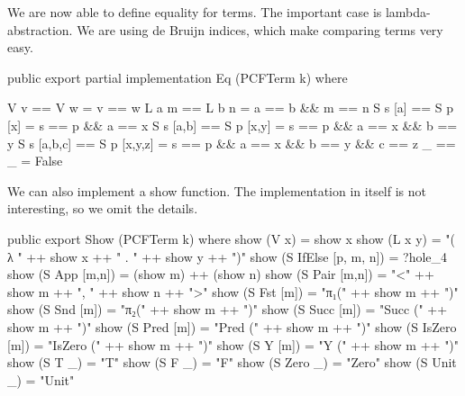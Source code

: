 We are now able to define equality for terms. The important case is
lambda-abstraction. We are using de Bruijn indices, which make comparing terms
very easy.

\begin{code}
public export partial
implementation Eq (PCFTerm k) where

  V v         == V w          = v == w
  L a m       == L b n        = a == b && m == n
  S s [a]     == S p [x]      = s == p && a == x
  S s [a,b]   == S p [x,y]    = s == p && a == x && b == y
  S s [a,b,c] == S p [x,y,z]  = s == p && a == x && b == y && c == z
  _           == _            = False
\end{code}

We can also implement a show function. The implementation in itself is not
interesting, so we omit the details.

\begin{hidden}
public export
Show (PCFTerm k) where
  show (V x)   = show x
  show (L x y) = "( λ " ++ show x ++ " . " ++ show y ++ ")"
  show (S IfElse [p, m, n]) = ?hole_4
  show (S App    [m,n]) = (show m) ++ (show n)
  show (S Pair   [m,n]) = "<" ++ show m ++ ", " ++ show n ++ ">"
  show (S Fst    [m])   = "π₁(" ++ show m ++ ")"
  show (S Snd    [m])   = "π₂(" ++ show m ++ ")"
  show (S Succ   [m])   = "Succ (" ++ show m ++ ")"
  show (S Pred   [m])   = "Pred (" ++ show m ++ ")"
  show (S IsZero [m])   = "IsZero (" ++ show m ++ ")"
  show (S Y      [m])   = "Y (" ++ show m ++ ")"
  show (S T      _)     = "T"
  show (S F      _)     = "F"
  show (S Zero   _)     = "Zero"
  show (S Unit   _)     = "Unit"
\end{hidden}
